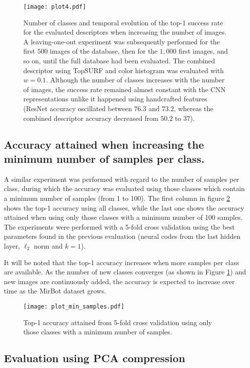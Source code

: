 \documentclass[final, twocolumn]{elsarticle}
\begin{document}
\begin{figure}
\center
\texttt{[image: plot4.pdf]}
\caption{\label{Plot4}Number of classes and temporal evolution of the top-1 success rate for the evaluated descriptors when increasing the number of images. A leaving-one-out experiment was subsequently performed for the first $500$ images of the database, then for the $1,000$ first images, and so on, until the full database had been evaluated. The combined descriptor using TopSURF and color histogram was evaluated with $w=0.1$. Although the number of classes increases with the number of images, the success rate remained almost constant with the CNN representations unlike it happened using handcrafted features (ResNet accuracy oscillated between $76.3$ and $73.2$, whereas the combined descriptor accuracy decreased from $50.2$ to $37$).}
\end{figure}


\subsection{Accuracy attained when increasing the minimum number of samples per class.}

A similar experiment was performed with regard to the number of samples per class, during which the accuracy was evaluated using those classes which contain a minimum number of samples (from 1 to 100). The first column in figure \ref{fig:plot_min_samples} shows the top-1 accuracy using all classes, while the last one shows the accuracy attained when using only those classes with a minimum number of 100 samples. The experiments were performed with a 5-fold cross validation using the best parameters found in the previous evaluation (neural codes from the last hidden layer, $\ell_2$ norm and $k=1$).

It will be noted that the top-1 accuracy increases when more samples per class are available. As the number of new classes converges (as shown in Figure \ref{Plot4}) and new images are continuously added, the accuracy is expected to increase over time as the MirBot dataset grows.

\begin{figure}
\center
\texttt{[image: plot\_min\_samples.pdf]}
\caption{\label{fig:plot_min_samples}Top-1 accuracy attained from 5-fold cross validation using only those classes with a minimum number of samples.}
\end{figure}


\subsection{Evaluation using PCA compression}
\label{sec:pca}
\end{document}
